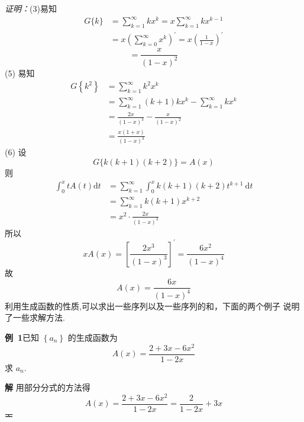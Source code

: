 \documentclass{report}
\begin{document}
\textsl{证明：}(3)易知
$$
\begin{aligned}
G\{k\} &=\sum_{k=1}^{\infty} k x^{k}=x \sum_{k=1}^{\infty} k x^{k-1} \\
&=x\left(\sum_{k=0}^{\infty} x^{k}\right)^{\prime}=x\left(\frac{1}{1-x}\right)^{\prime}
\end{aligned}
$$
$$
=\frac{x}{(1-x)^{2}}
$$
(5) 易知
$$
\begin{aligned}
G\left\{k^{2}\right\} &=\sum_{k=1}^{\infty} k^{2} x^{k} \\
&=\sum_{k=1}^{\infty}(k+1) k x^{k}-\sum_{k=1}^{\infty} k x^{k} \\
&=\frac{2 x}{(1-x)^{3}}-\frac{x}{(1-x)^{2}} \\
&=\frac{x(1+x)}{(1-x)^{3}}
\end{aligned}
$$
(6) 设
$$
G\{k(k+1)(k+2)\}=A(x)
$$
则
$$
\begin{aligned}
\int_{0}^{x} t A(t) \mathrm{d} t &=\sum_{k=1}^{\infty} \int_{0}^{x} k(k+1)(k+2) t^{k+1} \mathrm{~d} t \\
&=\sum_{k=1}^{\infty} k(k+1) x^{k+2} \\
&=x^{2} \cdot \frac{2 x}{(1-x)^{3}}
\end{aligned}
$$
所以
$$
x A(x)=\left[\frac{2 x^{3}}{(1-x)^{3}}\right]^{\prime}=\frac{6 x^{2}}{(1-x)^{4}}
$$
故
$$
A(x)=\frac{6 x}{(1-x)^{4}}
$$
利用生成函数的性质,可以求出一些序列以及一些序列的和，下面的两个例子 说明了一些求解方法.

\noindent
\textbf{例\ 1}已知 $\left\{a_{n}\right\}$ 的生成函数为
$$
A(x)=\frac{2+3 x-6 x^{2}}{1-2 x}
$$
求 $a_{n}$.

\textbf{解  }用部分分式的方法得
$$
A(x)=\frac{2+3 x-6 x^{2}}{1-2 x}=\frac{2}{1-2 x}+3 x
$$
而
$$
\frac{2}{1-2 x}=2 \sum_{n=0}^{\infty} 2^{n} x^{n}=\sum_{n=0}^{\infty} 2^{n+1} x^{n}
$$
所以有
$$
a_{n}=\left\{\begin{array}{ll}
2^{n+1} & (n \neq 1) \\
2^{2}+3=7 & (n=1)
\end{array}\right.
$$

\textbf{例\ 2}计算级数
$$
1^{2}+2^{2}+\cdots+n^{2}
$$
的和.
\end{document}
